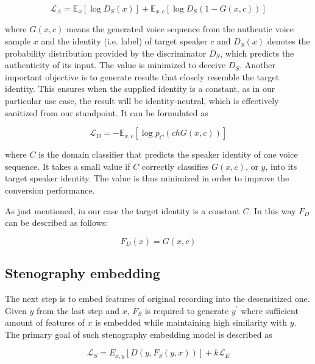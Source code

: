 \documentclass[journal]{IEEEtran} %
\begin{document}
\begin{equation}
    \label{eqn:adv_loss}
    \mathcal{L}_A = \mathbb{E}_{x}[\log D_S(x)] + \mathbb{E}_{x, c}[\log D_S(1 - G(x, c))]
\end{equation}

where $G(x, c)$ means the generated voice sequence from the authentic voice sample $x$ and the identity (i.e. label) of target speaker $c$ and $D_S(x)$ denotes the probability distribution provided by the discriminator $D_S$, which predicts the authenticity of its input. The value is minimized to deceive $D_S$. Another important objective is to generate results that closely resemble the target identity. This ensures when the supplied identity is a constant, as in our particular use case, the result will be identity-neutral, which is effectively sanitized from our standpoint. It can be formulated as

\begin{equation}
    \label{eqn:dom_loss}
    \mathcal{L}_D = - \mathbb{E}_{x, c}[\log p_C(c \hbar G(x, c))]
\end{equation}

where $C$ is the domain classifier that predicts the speaker identity of one voice sequence. It takes a small value if $C$ correctly classifies $G(x, c)$, or $y$, into its target speaker identity. The value is thus minimized in order to improve the conversion performance.

As just mentioned, in our case the target identity is a constant $C$. In this way $F_D$ can be described as follows:

\begin{equation}
    \label{eqn:fd_val}
    F_D(x) = G(x, c)
\end{equation}

\subsection{Stenography embedding}

The next step is to embed features of original recording into the desensitized one. Given $y$ from the last step and $x$, $F_S$ is required to generate $y^{\prime}$ where sufficient amount of features of $x$ is embedded while maintaining high similarity with $y$. The primary goal of such stenography embedding model is described as

\begin{equation}
    \label{eqn:embed_loss}
    \mathcal{L}_S = E_{x, y}[D(y, F_S(y, x))] + k\mathcal{L}_E
\end{equation}
\end{document}
